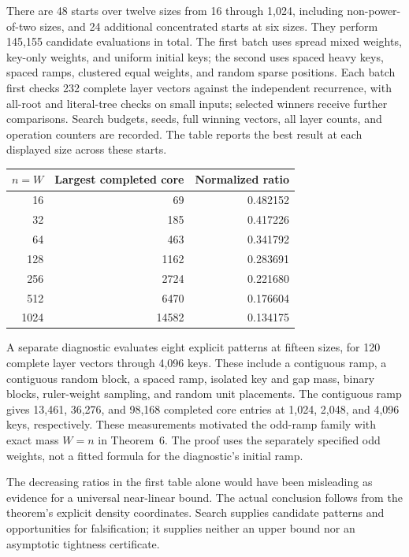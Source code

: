 \documentclass[11pt]{article}
\begin{document}
There are 48 starts over twelve sizes from 16 through 1,024, including
non-power-of-two sizes, and 24 additional concentrated starts at six sizes.
They perform 145,155 candidate evaluations in total. The first batch uses
spread mixed weights, key-only weights, and uniform initial keys; the second
uses spaced heavy keys, spaced ramps, clustered equal weights, and random
sparse positions. Each batch first checks 232 complete layer vectors against
the independent recurrence, with all-root and literal-tree checks on small
inputs; selected winners receive further comparisons. Search budgets, seeds,
full winning vectors, all layer counts, and operation counters are recorded.
The table reports the best result at each displayed size across these starts.
\begin{center}
\begin{tabular}{rrr}
\toprule
$n=W$ & Largest completed core & Normalized ratio\\
\midrule
16 & 69 & 0.482152\\
32 & 185 & 0.417226\\
64 & 463 & 0.341792\\
128 & 1162 & 0.283691\\
256 & 2724 & 0.221680\\
512 & 6470 & 0.176604\\
1024 & 14582 & 0.134175\\
\bottomrule
\end{tabular}
\end{center}

A separate diagnostic evaluates eight explicit patterns at fifteen sizes,
for 120 complete layer vectors through 4,096 keys. These include a contiguous
ramp, a contiguous random block, a spaced ramp, isolated key and gap mass,
binary blocks, ruler-weight sampling, and random unit placements. The
contiguous ramp gives 13,461, 36,276, and 98,168 completed core entries at
1,024, 2,048, and 4,096 keys, respectively. These measurements motivated the
odd-ramp family with exact mass $W=n$ in Theorem~6.
The proof uses the separately specified odd weights, not a fitted formula
for the diagnostic's initial ramp.

The decreasing ratios in the first table alone would have been misleading
as evidence for a universal near-linear bound. The actual conclusion follows
from the theorem's explicit density coordinates. Search supplies candidate
patterns and opportunities for falsification; it supplies neither an upper
bound nor an asymptotic tightness certificate.
\end{document}
